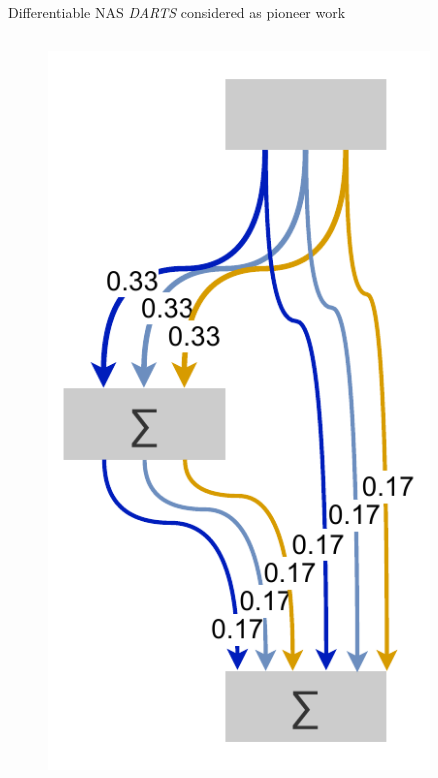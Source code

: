 \documentclass[]{beamer}
\begin{document}
\begin{frame}{Differentiable NAS}
\vspace{10pt}
\textit{DARTS} \cite{Liu2018} considered as pioneer work
\vfill
\begin{columns}
\begin{column}{.35\textwidth}
\begin{figure}
	\includegraphics[scale=0.4, center]{graphics/darts_1.pdf}
\end{figure}
\end{column}
\begin{column}{.3\textwidth}
\end{column}
\begin{column}{.35\textwidth}
\end{column}
\end{columns}
\end{frame}
\end{document}
